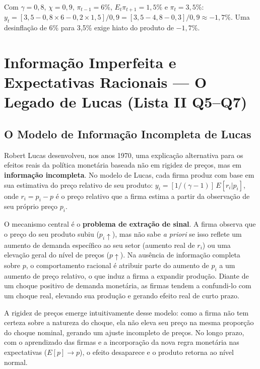 \documentclass[12pt, a4paper]{article}
\begin{document}
\begin{provabox}[title={Exemplo Numérico Q10 --- Para a Prova}]
Com $\gamma=0{,}8$, $\chi=0{,}9$, $\pi_{t-1}=6\%$, $E_t\pi_{t+1}=1{,}5\%$ e $\pi_t=3{,}5\%$:
$y_t = [3{,}5 - 0{,}8\times6 - 0{,}2\times1{,}5]/0{,}9 = [3{,}5 - 4{,}8 - 0{,}3]/0{,}9 \approx -1{,}7\%$.
Uma desinflação de 6\% para 3,5\% exige hiato do produto de $-1{,}7\%$.
\end{provabox}

\section{Informação Imperfeita e Expectativas Racionais --- O Legado de Lucas (Lista II Q5--Q7)}

\subsection{O Modelo de Informação Incompleta de Lucas}

Robert Lucas desenvolveu, nos anos 1970, uma explicação alternativa para os efeitos reais da política monetária baseada não em rigidez de preços, mas em \textbf{informação incompleta}. No modelo de Lucas, cada firma produz com base em sua estimativa do preço relativo de seu produto: $y_i = [1/(\gamma-1)]\,E[r_i|p_i]$, onde $r_i = p_i - p$ é o preço relativo que a firma estima a partir da observação de seu próprio preço $p_i$.

O mecanismo central é o \textbf{problema de extração de sinal}. A firma observa que o preço do seu produto subiu ($p_i\uparrow$), mas não sabe \emph{a priori} se isso reflete um aumento de demanda específico ao seu setor (aumento real de $r_i$) ou uma elevação geral do nível de preços ($p\uparrow$). Na ausência de informação completa sobre $p$, o comportamento racional é atribuir parte do aumento de $p_i$ a um aumento de preço relativo, o que induz a firma a expandir produção. Diante de um choque positivo de demanda monetária, as firmas tendem a confundi-lo com um choque real, elevando sua produção e gerando efeito real de curto prazo.

A rigidez de preços emerge intuitivamente desse modelo: como a firma não tem certeza sobre a natureza do choque, ela não eleva seu preço na mesma proporção do choque nominal, gerando um ajuste incompleto de preços. No longo prazo, com o aprendizado das firmas e a incorporação da nova regra monetária nas expectativas ($E[p] \to p$), o efeito desaparece e o produto retorna ao nível normal.
\end{document}
